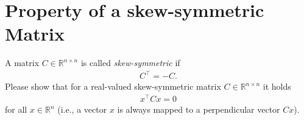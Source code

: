 \section{Property of a skew-symmetric Matrix}
\label{ex:skewsymm}
A matrix $C \in \mathbb{R}^{n \times n}$ is called \textit{skew-symmetric} if
\begin{align*}
C^\top = -C.
\end{align*}
Please show that for a real-valued skew-symmetric matrix $C \in \mathbb{R}^{n\times n}$ it holds
\begin{align*}
x^\top C x = 0
\end{align*}
for all $x \in \mathbb{R}^n$ (i.e., a vector $x$ is always mapped to a perpendicular vector $Cx$).